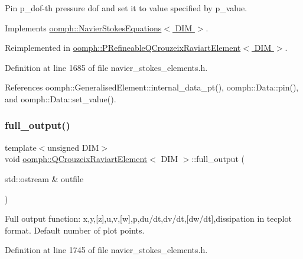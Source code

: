 Pin p\+\_\+dof-\/th pressure dof and set it to value specified by p\+\_\+value. 



Implements \hyperlink{classoomph_1_1NavierStokesEquations_aa33a3dd5c1cdba0a044e40ad290e487c}{oomph\+::\+Navier\+Stokes\+Equations$<$ D\+I\+M $>$}.



Reimplemented in \hyperlink{classoomph_1_1PRefineableQCrouzeixRaviartElement_a31a014a5e5d549d793968245d56d5d69}{oomph\+::\+P\+Refineable\+Q\+Crouzeix\+Raviart\+Element$<$ D\+I\+M $>$}.



Definition at line 1685 of file navier\+\_\+stokes\+\_\+elements.\+h.



References oomph\+::\+Generalised\+Element\+::internal\+\_\+data\+\_\+pt(), oomph\+::\+Data\+::pin(), and oomph\+::\+Data\+::set\+\_\+value().

\mbox{\label{classoomph_1_1QCrouzeixRaviartElement_a9ee28cdd78a66ab09733322caeeff502}} 
\subsubsection{\texorpdfstring{full\+\_\+output()}{full\_output()}\hspace{0.1cm}{\footnotesize\ttfamily [1/2]}}
{\footnotesize\ttfamily template$<$unsigned D\+IM$>$ \\
void \hyperlink{classoomph_1_1QCrouzeixRaviartElement}{oomph\+::\+Q\+Crouzeix\+Raviart\+Element}$<$ D\+IM $>$\+::full\+\_\+output (\begin{DoxyParamCaption}\item[{std\+::ostream \&}]{outfile }\end{DoxyParamCaption})\hspace{0.3cm}{\ttfamily [inline]}}



Full output function\+: x,y,\mbox{[}z\mbox{]},u,v,\mbox{[}w\mbox{]},p,du/dt,dv/dt,\mbox{[}dw/dt\mbox{]},dissipation in tecplot format. Default number of plot points. 



Definition at line 1745 of file navier\+\_\+stokes\+\_\+elements.\+h.



